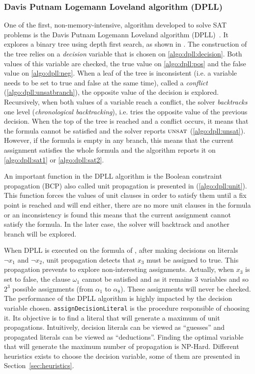 \subsubsection{Davis Putnam Logemann Loveland algorithm (DPLL)}\label{sec:dpll}
One of the first, non-memory-intensive, algorithm developed to solve SAT problems is 
the Davis Putnam Logemann Loveland algorithm (DPLL)~\cite{dpll_62}. 
It explores a binary tree using depth first search, as shown in .
The construction of the tree  relies on a \emph{decision} variable  that is chosen on \cref{algo:dpll:decision}.
Both values of this variable are checked, the true value on \cref{algo:dpll:pos} and the false value on \cref{algo:dpll:neg}.
When a leaf of the tree is inconsistent (i.e. a variable needs to be set to true and false at the same time), called a \textit{conflict}
 (\cref{algo:dpll:unsatbranch}), the opposite value of the decision is explored.
Recursively, when both values of a variable reach a conflict,
the solver \emph{backtracks} one level (\emph{chronological backtracking}), i.e. tries the opposite value of 
the previous decision.
When the top of the tree is reached and a conflict occurs, it means that the formula cannot be satisfied and the 
solver reports $\textsc{unsat}$ (\cref{algo:dpll:unsat}). However, if the formula is empty in any branch, 
this means that the current assignment satisfies the whole formula and the algorithm reports it on \cref{algo:dpll:sat1}
or \ref{algo:dpll:sat2}.

An important function in the DPLL algorithm is the Boolean constraint propagation (BCP) also called unit propagation
is presented in (\cref{algo:dpll:unit}).
This function forces the values of unit clauses in order to satisfy them
until a fix point is reached and will end either, there
are no more unit clauses in the formula or an inconsistency 
is found this means that the current assignment cannot satisfy the formula. 
In the later case, the solver will backtrack and another branch will be explored.



When DPLL is executed on the formula of , after making decisions on literals
$\neg x_1$ and $\neg x_2$, unit propagation detects that $x_3$ must be assigned to true.
This propagation prevents to explore non-interesting assignments. Actually, when $x_3$ is set to false,
the clause $\omega_1$ cannot be satisfied and as it remains 3 variables and so $2^3$ possible assignments
(from $\alpha_1$ to $\alpha_8$). These assignments will never be checked.
The performance of the DPLL algorithm is highly impacted by the decision variable chosen.
\texttt{assignDecisionLiteral} is the procedure responsible of choosing it.
Its objective is to find a literal that will generate a maximum of unit propagations.
Intuitively, decision literals can be viewed as “guesses” and propagated literals can be viewed as “deductions”. 
Finding the optimal variable that will generate the maximum number of propagation is NP-Hard\cite{biere2009handbook}.
Different heuristics exists to choose the decision variable, some of them are presented in Section~\ref{sec:heuristics}.


